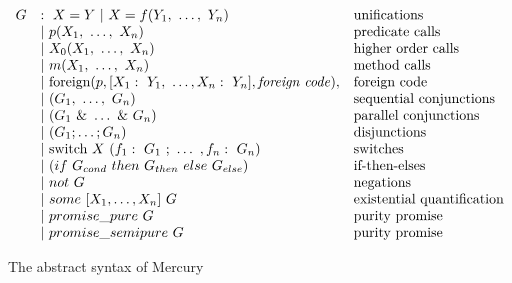 \begin{figure}
\[
\begin{array}{lll}
G
    & :~ X = Y ~|~ X = f(Y_1,~\ldots,~Y_n)
        & \hbox{unifications}\\
    & |~ p(X_1,~\ldots,~X_n)
        & \hbox{predicate calls} \\
    & |~ X_0(X_1,~\ldots,~X_n)
        & \hbox{higher order calls} \\
    & |~ m(X_1,~\ldots,~X_n)
        & \hbox{method calls} \\
    & |~ \hbox{foreign}(p,
        [X_1:~Y_1,~\ldots,X_n:~Y_n],
        \hbox{\emph{foreign code}}),
        & \hbox{foreign code} \\
    & |~ (G_1,~\ldots,~G_n)
        & \hbox{sequential conjunctions}\\
    & |~ (G_1~\&~\ldots~\&~G_n)
        & \hbox{parallel conjunctions}\\
    & |~ (G_1 ; \ldots ; G_n)
        & \hbox{disjunctions}\\
    & |~ \hbox{switch}~X~(f_1:~G_1~;~\ldots~,f_n:~G_n)
        & \hbox{switches}\\
    & |~ (if~G_{cond}~then~G_{then}~else~G_{else})
        & \hbox{if-then-elses}\\
    & |~ not~G
        & \hbox{negations}\\
    & |~ some~[X_1,\ldots,X_n]~G
        & \hbox{existential quantification}\\
    & |~ promise\_pure~G
        & \hbox{purity promise}\\
    & |~ promise\_semipure~G
        & \hbox{purity promise}\\
\end{array}
\]
\caption{The abstract syntax of Mercury}
\label{fig:abstractsyntax}
\end{figure}

